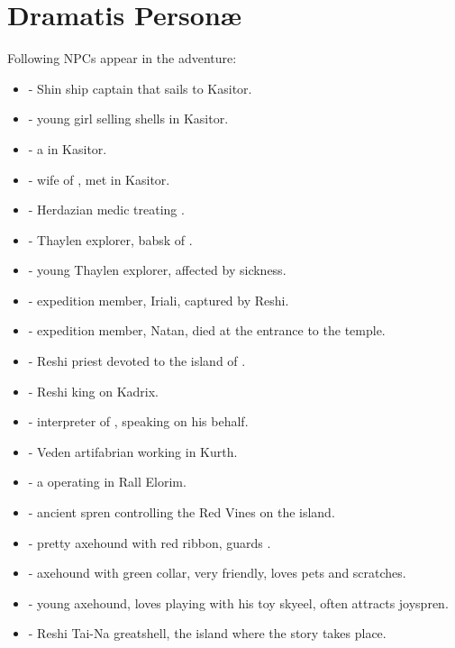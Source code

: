 \section{Dramatis Person\ae}
\label{personae}

Following NPCs appear in the adventure:

\begin{itemize}
	\item \npcShinCaptain[s] - Shin ship captain that sails to Kasitor.
	\item \npcShellSeller[s] - young girl selling shells in Kasitor.
	\item \npcDrunkenSailor[s] - a \enemyDrunkenSailor{} in Kasitor.
	\item  \npcWorriedWife[s] - wife of \npcCapturedExplorer{}, met in Kasitor.
	\item \npcMedic[s]{} - Herdazian medic treating \npcSickGirl{}.
	\item \npcBabsk[s]{} - Thaylen explorer, babsk of \npcSickGirl{}.
	\item \npcSickGirl[s]{} - young Thaylen explorer, affected by sickness.
	\item \npcCapturedExplorer[s]{} - expedition member, Iriali, captured by Reshi.
	\item \npcDeadExplorer[s]{} - expedition member, Natan, died at the entrance to the temple.
	\item \npcReshiPriest[s]{} - Reshi priest devoted to the island of \npcSprenVines{}.
	\item \npcReshiKing[s] - Reshi king on Kadrix.
	\item \npcReshiInterpreter[s] - interpreter of \npcReshiKing{}, speaking on his behalf.
	\item \npcArtifabrian[s] - Veden artifabrian working in Kurth.
	\item \npcRogueShardbearer[s] - a \enemyRogueShardbearer{} operating in Rall Elorim.
	\item \npcSprenVines{} - ancient spren controlling the Red Vines on the island.
	\item \npcHoundLady{} - pretty axehound with red ribbon, guards \npcSickGirl{}.
	\item \npcHoundScratch{} - axehound with green collar, very friendly, loves pets and scratches.
	\item \npcHoundFetch{} - young axehound, loves playing with his toy skyeel, often attracts joyspren.
	\item \theIsland{} - Reshi Tai-Na greatshell, the island where the story takes place.
\end{itemize}